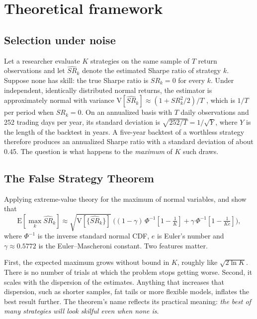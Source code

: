 \documentclass[11pt]{article}
\begin{document}
\section{Theoretical framework}\label{sec:theory}

\subsection{Selection under noise}
Let a researcher evaluate $K$ strategies on the same sample of $T$ return observations and let $\widehat{SR}_k$ denote the estimated Sharpe ratio of strategy $k$. Suppose none has skill: the true Sharpe ratio is $SR_k = 0$ for every $k$. Under independent, identically distributed normal returns, the estimator is approximately normal with variance $\mathrm{V}[\widehat{SR}_k] \approx (1 + SR_k^2/2)/T$ \citep{lo2002}, which is $1/T$ per period when $SR_k = 0$. On an annualized basis with $T$ daily observations and 252 trading days per year, its standard deviation is $\sqrt{252/T} = 1/\sqrt{Y}$, where $Y$ is the length of the backtest in years. A five-year backtest of a worthless strategy therefore produces an annualized Sharpe ratio with a standard deviation of about 0.45. The question is what happens to the \emph{maximum} of $K$ such draws.

\subsection{The False Strategy Theorem}
Applying extreme-value theory for the maximum of normal variables, \citet{bailey2014dsr} and \citet{lopezdeprado2021fst} show that
\begin{equation}\label{eq:fst}
\mathrm{E}\!\left[\max_k \widehat{SR}_k\right] \approx \sqrt{\mathrm{V}\!\left[\{\widehat{SR}_k\}\right]}\;\Big( (1-\gamma)\,\Phi^{-1}\!\left[1 - \tfrac{1}{K}\right] + \gamma\,\Phi^{-1}\!\left[1 - \tfrac{1}{K e}\right] \Big),
\end{equation}
where $\Phi^{-1}$ is the inverse standard normal CDF, $e$ is Euler's number and $\gamma \approx 0.5772$ is the Euler--Mascheroni constant. Two features matter.

First, the expected maximum grows without bound in $K$, roughly like $\sqrt{2\ln K}$. There is no number of trials at which the problem stops getting worse. Second, it scales with the dispersion of the estimates. Anything that increases that dispersion, such as shorter samples, fat tails or more flexible models, inflates the best result further. The theorem's name reflects its practical meaning: \emph{the best of many strategies will look skilful even when none is}.
\end{document}
